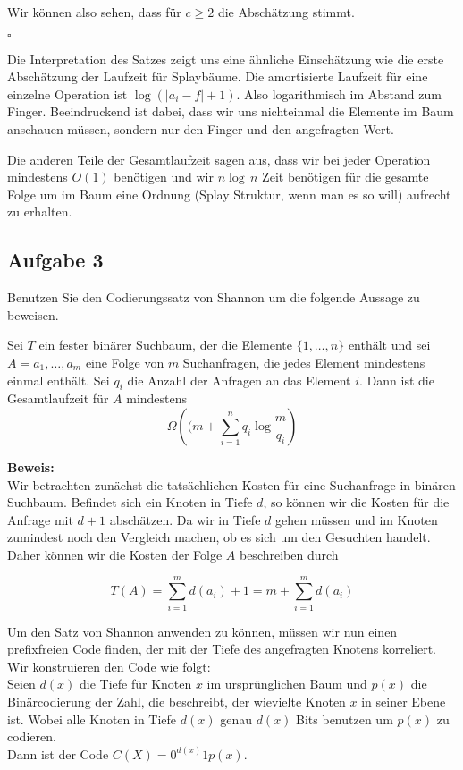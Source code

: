 \documentclass[11pt,a4paper,ngerman]{article}
\begin{document}
Wir können also sehen, dass für $c \geq 2$ die Abschätzung stimmt.

\mbox{}\hfill$\square$

Die Interpretation des Satzes zeigt uns eine ähnliche Einschätzung wie die erste Abschätzung der Laufzeit für Splaybäume. 
Die amortisierte Laufzeit für eine einzelne Operation ist $\log (|a_i - f| + 1)$. Also logarithmisch im Abstand zum Finger. Beeindruckend ist dabei,
dass wir uns nichteinmal die Elemente im Baum anschauen müssen, sondern nur den Finger und den angefragten Wert.

Die anderen Teile der Gesamtlaufzeit sagen aus, dass wir bei jeder Operation mindestens $O(1)$ benötigen und wir $n \log \, n$ Zeit
benötigen für die gesamte Folge um im Baum eine Ordnung (Splay Struktur, wenn man es so will) aufrecht zu erhalten.

\subsection*{Aufgabe 3}
Benutzen Sie den Codierungssatz von Shannon um die folgende Aussage zu beweisen.

Sei $T$ ein fester binärer Suchbaum, der die Elemente $\{1,\ldots,n\}$ enthält und sei $A=a_1,\ldots,a_m$ eine Folge von $m$ Suchanfragen, die jedes Element mindestens einmal enthält. Sei $q_i$ die Anzahl der Anfragen an das Element $i$. Dann ist die Gesamtlaufzeit für $A$ mindestens
$$
   \Omega\left((m + \sum_{i=1}^n q_i \log \frac{m}{q_i}\right)
$$

\noindent\textbf{Beweis:}\\

Wir betrachten zunächst die tatsächlichen Kosten für eine Suchanfrage in binären Suchbaum. Befindet sich ein Knoten in Tiefe $d$, so können wir
die Kosten für die Anfrage mit $d+1$ abschätzen. Da wir in Tiefe $d$ gehen müssen und im Knoten zumindest noch den Vergleich machen, ob es sich um den Gesuchten handelt. Daher können wir die Kosten der Folge $A$ beschreiben durch

$$
	T(A) = \sum_{i=1}^m d(a_i) + 1 = m + \sum_{i=1}^m d(a_i)
$$

Um den Satz von Shannon anwenden zu können, müssen wir nun einen prefixfreien Code finden, der mit der Tiefe des angefragten Knotens
korreliert. Wir konstruieren den Code wie folgt:\\

Seien $d(x)$ die Tiefe für Knoten $x$ im ursprünglichen Baum und $p(x)$ die Binärcodierung der Zahl, die beschreibt, der wievielte Knoten $x$ in seiner Ebene ist. Wobei alle Knoten in Tiefe $d(x)$ genau $d(x)$ Bits benutzen um $p(x)$ zu codieren.\\
Dann ist der Code $C(X) = 0^{d(x)}1p(x)$.
\end{document}
